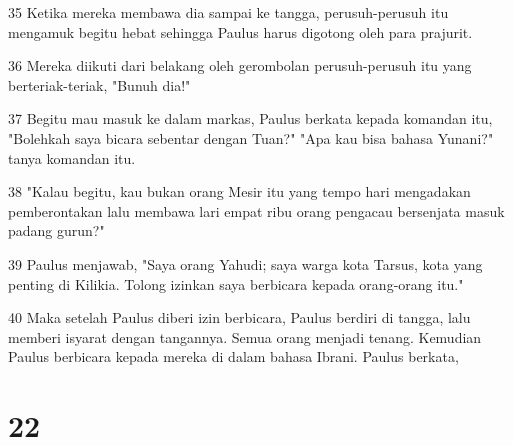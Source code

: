 \par 35 Ketika mereka membawa dia sampai ke tangga, perusuh-perusuh itu mengamuk begitu hebat sehingga Paulus harus digotong oleh para prajurit.
\par 36 Mereka diikuti dari belakang oleh gerombolan perusuh-perusuh itu yang berteriak-teriak, "Bunuh dia!"
\par 37 Begitu mau masuk ke dalam markas, Paulus berkata kepada komandan itu, "Bolehkah saya bicara sebentar dengan Tuan?" "Apa kau bisa bahasa Yunani?" tanya komandan itu.
\par 38 "Kalau begitu, kau bukan orang Mesir itu yang tempo hari mengadakan pemberontakan lalu membawa lari empat ribu orang pengacau bersenjata masuk padang gurun?"
\par 39 Paulus menjawab, "Saya orang Yahudi; saya warga kota Tarsus, kota yang penting di Kilikia. Tolong izinkan saya berbicara kepada orang-orang itu."
\par 40 Maka setelah Paulus diberi izin berbicara, Paulus berdiri di tangga, lalu memberi isyarat dengan tangannya. Semua orang menjadi tenang. Kemudian Paulus berbicara kepada mereka di dalam bahasa Ibrani. Paulus berkata,

\chapter{22}

